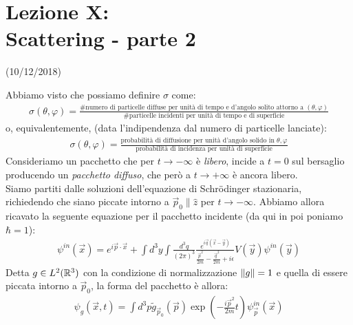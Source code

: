 \documentclass[../../FisicaTeorica.tex]{subfiles}
\begin{document}
\section{Lezione X:\\ \large{Scattering - parte 2}}
\vspace{-1em}
\begin{center}
    \small{(10/12/2018)}
\end{center}
Abbiamo visto che possiamo definire $\sigma$ come:
\begin{align*}
\sigma(\theta,\varphi) = \frac{\text{\#numero di particelle diffuse per unità di tempo e d'angolo solito attorno a $(\theta,\varphi)$}}{\text{\#particelle incidenti per unità di tempo e di superficie}}
\end{align*}
o, equivalentemente, (data l'indipendenza dal numero di particelle lanciate):
\begin{align*}
\sigma(\theta,\varphi) = \frac{\text{probabilità di diffusione per unità d'angolo solido in $\theta,\varphi$}}{\text{probabilità di incidenza per unità di superficie}}
\end{align*}
Consideriamo un pacchetto che per $t\to -\infty$ è \textit{libero}, incide a $t=0$ sul bersaglio producendo un \textit{pacchetto diffuso}, che però a $t\to +\infty$ è ancora libero.\\
Siamo partiti dalle soluzioni dell'equazione di Schr\"odinger stazionaria, richiedendo che siano piccate intorno a $\vec{p}_0\parallel \hat{z}$ per $t\to -\infty$. Abbiamo allora ricavato la seguente equazione per il pacchetto incidente (da qui in poi poniamo $\hbar=1$):
\begin{align*}
\psi^{in}(\vec{x}) = e^{i\vec{p}\cdot \vec{x}} + \int d^3 y \int \frac{d^3q}{(2\pi)^3} \frac{e^{i\vec{q}(\vec{x}-\vec{y})}}{\displaystyle \frac{\vec{p}^2}{2m}-\frac{\vec{q}^2}{2m}+i\epsilon} V(\vec{y}) \psi^{in}(\vec{y})
\end{align*}
Detta $g\in L^2(\mathbb{R}^3)$ con la condizione di normalizzazione $\left\lVert g\right\rVert=1$ e quella di essere piccata intorno a $\vec{p}_0$, la forma del pacchetto è allora:
\begin{align*}
\psi_g(\vec{x},t) = \int d^3p \tilde{g}_{\vec{p}_0}(\vec{p}) \exp\left(-\frac{i\vec{p}^2}{2m}t\right) \psi_{\vec{p}}^{in}(\vec{x})
\end{align*}
\end{document}
